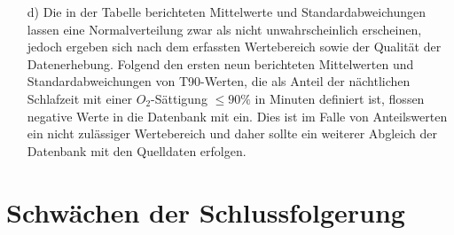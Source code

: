 \documentclass{scrartcl}
\theoremstyle{definition}
\theoremstyle{remark}
\begin{document}
\begin{enumerate}
	\item[d) ]Die in der Tabelle berichteten Mittelwerte und Standardabweichungen lassen eine Normalverteilung zwar als nicht unwahrscheinlich erscheinen, jedoch ergeben sich nach dem erfassten Wertebereich sowie der Qualität der Datenerhebung. Folgend den ersten neun berichteten Mittelwerten und Standardabweichungen von T90-Werten, die als Anteil der nächtlichen Schlafzeit mit einer $O_2$-Sättigung $\le 90\%$ in Minuten definiert ist, flossen negative Werte in die Datenbank mit ein. Dies ist im Falle von Anteilswerten ein nicht zulässiger Wertebereich und daher sollte ein weiterer Abgleich der Datenbank mit den Quelldaten erfolgen.    
\end{enumerate}


\section{Schwächen der Schlussfolgerung}





%

%
%

\end{document}
